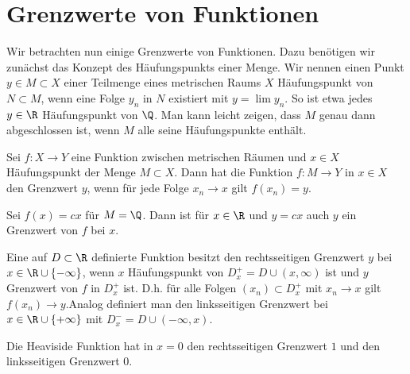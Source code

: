 \documentclass[letterpaper,10pt,english]{jupyterBook}
\begin{document}
\section{Grenzwerte von Funktionen}
\label{\detokenize{stetigkeit/grenzwerte:grenzwerte-von-funktionen}}\label{\detokenize{stetigkeit/grenzwerte::doc}}
Wir betrachten nun einige Grenzwerte von Funktionen. Dazu benötigen wir zunächst das Konzept des Häufungspunkts einer Menge. Wir nennen einen Punkt  \(y \in M \subset X\) einer Teilmenge eines metrischen Raums \(X\) Häufungspunkt von \(N \subset M\), wenn eine Folge \(y_n\) in \(N\) existiert mit \(y= \lim y_n\). So ist etwa jedes \(y \in \R\) Häufungspunkt von \(\Q\). Man kann leicht zeigen, dass \(M\) genau dann abgeschlossen ist, wenn \(M\) alle seine Häufungspunkte enthält.
\label{stetigkeit/grenzwerte:definition-0}
\begin{definition}{}{}



Sei \(f: X \rightarrow Y\) eine Funktion zwischen metrischen Räumen und \(x \in X\) Häufungspunkt der Menge \(M \subset X\). Dann hat die Funktion \(f: M \rightarrow Y\) in \(x \in X\) den Grenzwert \(y\), wenn für jede Folge \(x_n \rightarrow x\) gilt \(f(x_n) = y\).
\end{definition}
\label{stetigkeit/grenzwerte:example-1}
\begin{example}{}{}



Sei \(f(x) =cx\) für \(M = \Q\). Dann ist für \(x \in \R\) und \(y=cx\) auch \(y\) ein Grenzwert von \(f\) bei \(x\).
\end{example}
\label{stetigkeit/grenzwerte:definition-2}
\begin{definition}{}{}



Eine auf \(D \subset \R\) definierte Funktion besitzt den rechtsseitigen Grenzwert \(y\) bei \(x \in \R \cup \{-\infty\}\), wenn \(x\)  Häufungspunkt von \(D_x^+=D \cup (x,\infty)\) ist und \(y\) Grenzwert von \(f\) in \(D_x^+\) ist. D.h. für alle Folgen \((x_n) \subset D_x^+\) mit \(x_n \rightarrow x\) gilt \(f(x_n) \rightarrow y\).Analog definiert man den linksseitigen Grenzwert bei \(x \in \R \cup \{+\infty\}\) mit \(D_x^-=D \cup (-\infty,x)\).
\end{definition}
\label{stetigkeit/grenzwerte:example-3}
\begin{example}{}{}



Die Heaviside Funktion hat in \(x=0\) den rechtsseitigen Grenzwert \(1\) und den linksseitigen Grenzwert \(0\).
\end{example}
\end{document}
